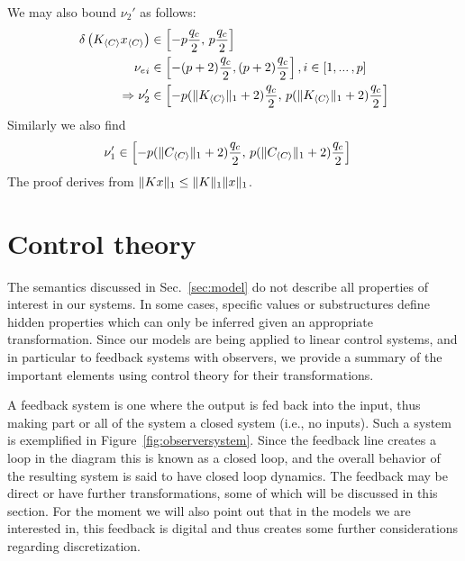 \documentclass[a4paper,UKenglish]{lipics-v2018}
\DeclarePairedDelimiter\norm{\lVert}{\rVert}
\newcommand{\mat}[1]{{#1}}
\renewcommand{\vec}[1]{{#1}}
\begin{document}
We may also bound $\nu_2'$ as follows:
\begin{align*}
\delta\left(\mat{K}_{\langle C\rangle} \vec{x}_{\langle C\rangle} \right) &\in \left[ -p \frac{q_c}{2},\, p \frac{q_c}{2}\right]\\
{\vec{\nu_e}}_i &\in \left[ -(p+2) \frac{q_c}{2}, (p+2) \frac{q_c}{2}\right], i \in [1, ...\,,p]\\
\Rightarrow \nu_2' &\in \left[  -p(\norm{\mat{K}_{\langle C \rangle}}_1+2) \frac{q_c}{2},\, p(\norm{\mat{K}_{\langle C \rangle}}_1+2) \frac{q_c}{2}\right]
\end{align*}
Similarly we also find
\begin{align*}
\nu_1' &\in \left[  -p(\norm{\mat{C}_{\langle C \rangle}}_1+2) \frac{q_c}{2},\, p(\norm{\mat{C}_{\langle C \rangle}}_1+2) \frac{q_c}{2}\right]
\end{align*}
The proof derives from $\norm{\mat{K}\vec{x}}_1 \leq \norm{\mat{K}}_1\norm{\vec{x}}_1$.

\section{Control theory}\label{sec:control_theory}

The semantics discussed in Sec.~\ref{sec:model} do not describe all
properties of interest in our systems.  In some cases, specific values or
substructures define hidden properties which can only be inferred given an
appropriate transformation.  Since our models are being applied to linear
control systems, and in particular to feedback systems with observers, we
provide a summary of the important elements using control theory for their
transformations.

A feedback system is one where the output is fed back into the input, thus
making part or all of the system a closed system (i.e., no inputs).  Such a
system is exemplified in Figure~\ref{fig:observersystem}.  Since the
feedback line creates a loop in the diagram this is known as a closed loop,
and the overall behavior of the resulting system is said to have closed loop
dynamics.  The feedback may be direct or have further transformations, some
of which will be discussed in this section.  For the moment we will also
point out that in the models we are interested in, this feedback is digital
and thus creates some further considerations regarding discretization.
\end{document}
